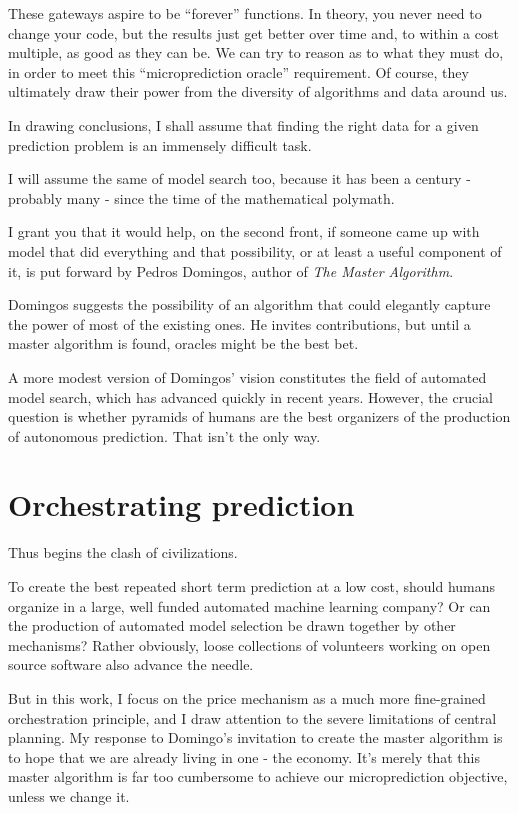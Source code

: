 These gateways aspire to be ``forever'' functions. In theory, you never need to change your code, but the results just get better over time and, to within a cost multiple, as good as they can be. We can try to reason as to what they must do, in order to meet this ``microprediction oracle'' requirement. Of course, they ultimately draw their power from the diversity of algorithms and data around us.  

In drawing conclusions, I shall assume that finding the right data for a given prediction problem is an immensely difficult task. 

I will assume the same of model search too, because it has been a century - probably many - since the time of the mathematical polymath. 

I grant you that it would help, on the second front, if someone came up with model that did everything and that possibility, or at least a useful component of it, is put forward by Pedros Domingos, author of {\em The Master Algorithm}. 

Domingos suggests the possibility of an algorithm that could elegantly capture the power of most of the existing ones. He invites contributions, but until a master algorithm is found, oracles might be the best bet. 

A more modest version of Domingos' vision constitutes the field of automated model search, which has advanced quickly in recent years. However, the crucial question is whether pyramids of humans are the best organizers of the production of autonomous prediction. That isn't the only way. 


\section{Orchestrating prediction}
Thus begins the clash of civilizations. 

To create the best repeated short term prediction at a low cost, should humans organize in a large, well funded automated machine learning company? Or can the production of automated model selection be drawn together by other mechanisms? Rather obviously, loose collections of volunteers working on open source software also advance the needle. 


But in this work, I focus on the price mechanism as a much more fine-grained orchestration principle, and I draw attention to the severe limitations of central planning. My response to Domingo's invitation to create the master algorithm is to hope that we are already living in one - the economy. It's merely that this master algorithm is far too cumbersome to achieve our microprediction objective, unless we change it. 


